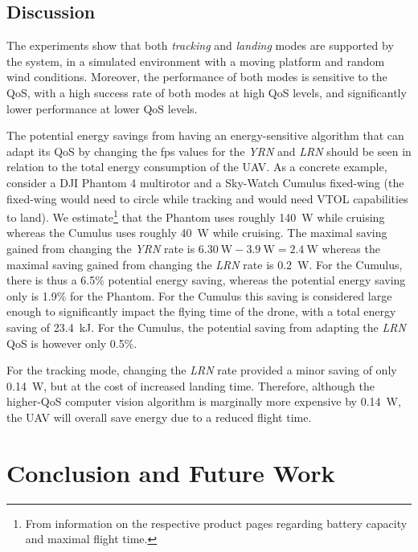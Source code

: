 \documentclass[conference]{IEEEtran}
\begin{document}
\subsection{Discussion}

The experiments show that both \emph{tracking} and \emph{landing} modes are
supported by the system, in a simulated environment with a moving
platform and random wind conditions. Moreover, the performance of both
modes is sensitive to the QoS, with a high success rate of both modes
at high QoS levels, and significantly lower performance at lower QoS
levels.

The potential energy savings from having an energy-sensitive algorithm
that can adapt its QoS by changing the fps values for the \emph{YRN} and \emph{LRN}
should be seen
in relation to the total energy consumption of the UAV. As a concrete
example, consider a DJI Phantom 4 multirotor and a Sky-Watch Cumulus
fixed-wing (the fixed-wing would need to circle while tracking and 
would need VTOL capabilities to land). We estimate\footnote{From information on the respective
  product pages regarding battery capacity and maximal flight time.}
that the Phantom uses roughly \SI{140}{\watt} while cruising whereas the Cumulus
uses roughly \SI{40}{\watt} while cruising. The maximal saving gained from
changing the \emph{YRN}
rate is 
$\SI{6.30}{\watt}-\SI{3.9}{\watt}=\SI{2.4}{\watt}$ whereas the
maximal saving gained from changing the \emph{LRN}
rate is
\SI{0.2}{\watt}. For the Cumulus, there is thus a 6.5\% potential energy
saving, whereas the potential energy saving only is 1.9\% for the
Phantom. For the Cumulus this saving is considered large enough to
significantly impact the flying time of the drone, with a total energy
saving of \SI{23.4}{\kilo \joule}. For the Cumulus, the potential saving from adapting
the \emph{LRN}
QoS is however only 0.5\%. 

For the tracking mode, changing the \emph{LRN}
rate
provided a minor saving of only \SI{0.14}{\watt}, but at the cost of increased
landing time. Therefore, although the higher-QoS computer vision
algorithm is marginally more expensive by \SI{0.14}{\watt}, the UAV will
overall save energy due to a reduced flight time.

\section{Conclusion and Future Work}
\label{sec:conclusion}
\end{document}
